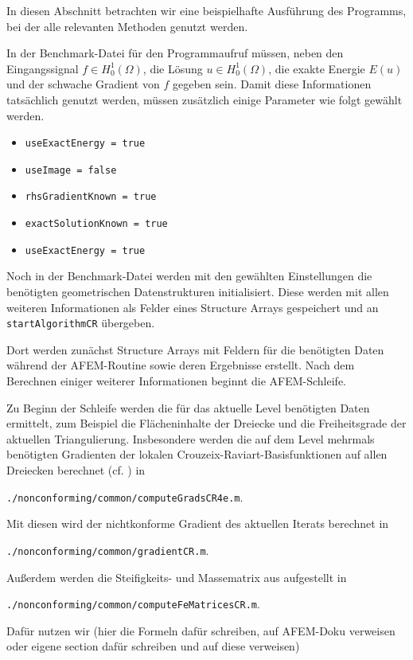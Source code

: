 In diesen Abschnitt betrachten wir eine beispielhafte Ausführung des Programms,
bei der alle relevanten Methoden genutzt werden.

In der Benchmark-Datei für den Programmaufruf müssen, neben den Eingangssignal
$f\in H^1_0(\Omega)$, die Lösung $u\in H^1_0(\Omega)$, die exakte Energie
$E(u)$ und der schwache Gradient von $f$ gegeben sein. 
Damit diese Informationen tatsächlich genutzt werden, müssen zusätzlich einige
Parameter wie folgt gewählt werden.
\begin{itemize}
  \item \texttt{useExactEnergy = true}
  \item \texttt{useImage = false}
  \item \texttt{rhsGradientKnown = true}
  \item \texttt{exactSolutionKnown = true}
  \item \texttt{useExactEnergy = true}
\end{itemize}

Noch in der Benchmark-Datei werden mit den gewählten Einstellungen die
benötigten geometrischen Datenstrukturen initialisiert. 
Diese werden mit allen weiteren Informationen als Felder eines Structure Arrays
gespeichert und an \texttt{startAlgorithmCR} übergeben. 

Dort werden zunächst Structure Arrays mit Feldern für die benötigten Daten
während der AFEM-Routine sowie deren Ergebnisse erstellt. 
Nach dem Berechnen einiger weiterer Informationen beginnt die AFEM-Schleife.

Zu Beginn der Schleife werden die für das aktuelle Level benötigten Daten
ermittelt, zum Beispiel die Flächeninhalte der Dreiecke und die Freiheitsgrade
der aktuellen Triangulierung. 
Insbesondere werden die auf dem Level mehrmals benötigten Gradienten der
lokalen Crouzeix-Raviart-Basisfunktionen auf allen Dreiecken berechnet (cf.
\cite[Abschnitt 1.4.2]{CGKNRR10}) in
\begin{center}
  \texttt{./nonconforming/common/computeGradsCR4e.m}.
\end{center}

Mit diesen wird der nichtkonforme Gradient des aktuellen Iterats 
berechnet in
\begin{center}
  \texttt{./nonconforming/common/gradientCR.m}.
\end{center}

Außerdem werden die Steifigkeits- und Massematrix aus
 aufgestellt in
\begin{center}
  \texttt{./nonconforming/common/computeFeMatricesCR.m}.
\end{center}
Dafür nutzen wir (hier die Formeln dafür schreiben, auf AFEM-Doku verweisen
oder eigene section dafür schreiben und auf diese verweisen)

